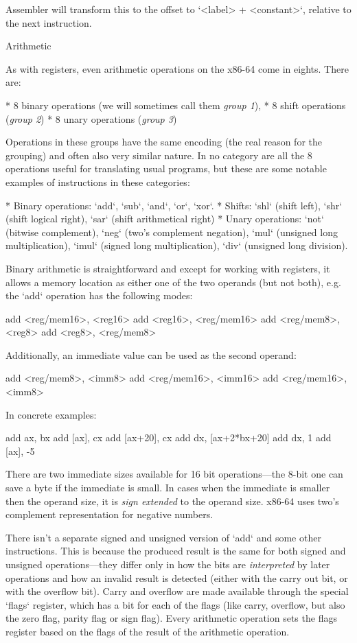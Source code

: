 \begtt {}
\endtt

Assembler will transform this to the offset to `<label> + <constant>`, relative to the next
instruction.
\enditems

\secc Arithmetic

As with registers, even arithmetic operations on the x86-64 come in eights.
There are:

\begitems
 * 8 binary operations (we will sometimes call them {\em group 1}),
 * 8 shift operations ({\em group 2})
 * 8 unary operations ({\em group 3})
\enditems

Operations in these groups have the same encoding (the real reason for the
grouping) and often also very similar nature. In no category are all
the 8 operations useful for translating usual programs, but these are some
notable examples of instructions in these categories:

\begitems
* Binary operations: `add`, `sub`, `and`, `or`, `xor`.
* Shifts: `shl` (shift left), `shr` (shift logical right), `sar` (shift
arithmetical right)
* Unary operations: `not` (bitwise complement), `neg` (two's complement
negation), `mul` (unsigned long multiplication), `imul` (signed long multiplication),
`div` (unsigned long division).
\enditems

Binary arithmetic is straightforward and except for working with registers, it
allows a memory location as either one of the two operands (but not both), e.g.
the `add` operation has the following modes:

\begtt \optparams
add <reg/mem16>, <reg16>
add <reg16>, <reg/mem16>
add <reg/mem8>, <reg8>
add <reg8>, <reg/mem8>
\endtt

Additionally, an immediate value can be used as the second operand:

\begtt \optparams
add <reg/mem8>, <imm8>
add <reg/mem16>, <imm16>
add <reg/mem16>, <imm8>
\endtt

In concrete examples:

\begtt
add ax, bx
add [ax], cx
add [ax+20], cx
add dx, [ax+2*bx+20]
add dx, 1
add [ax], -5
\endtt

There are two immediate sizes available for 16 bit operations---the 8-bit one
can save a byte if the immediate is small. In cases when the
immediate is smaller then the operand size, it is {\em sign extended} to the
operand size. x86-64 uses two's complement representation for negative numbers.

There isn't a separate signed and unsigned version of `add` and some other
instructions. This is because the produced result is the same for both signed and
unsigned operations---they differ only in how the bits are {\em interpreted} by
later operations and how an invalid result is detected (either with
the carry out bit, or with the overflow bit). Carry and overflow are made
available through the special `flags` register, which has a bit for each of the
flags (like carry, overflow, but also the zero flag, parity flag or
sign flag). Every arithmetic operation sets the flags register based on the
flags of the result of the arithmetic operation.

